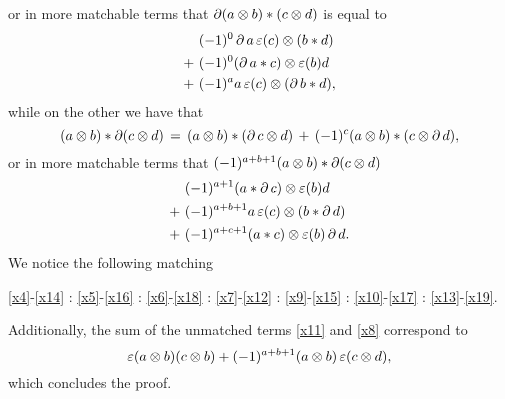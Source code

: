 or in more matchable terms that $\operatorname{\partial} (a \otimes b) \ast (c \otimes d)$ is equal to
\begin{align}& \label{x14}
	(-1)^0 \bd a \aug(c) \ot (b \ast d) \sk{+} \label{x15}
	(-1)^0 (\bd a \ast c) \ot \aug(b) d \sk{+} \label{x16}
	(-1)^{a} a \aug(c) \ot (\bd b \ast d),
\end{align}
while on the other we have that
\begin{equation*}
	(a \otimes b) \ast \operatorname{\partial} (c \otimes d) \,=\,
	(a \otimes b) \ast (\operatorname{\partial} c \otimes d) \,+\,
	(-1)^{c} (a \otimes b) \ast (c \otimes \operatorname{\partial} d),
\end{equation*}
or in more matchable terms that $(-1)^{a+b+1}(a \otimes b) \ast \operatorname{\partial} (c \otimes d)$
\begin{align}& \label{x17}
	(-1)^{a+1} (a \ast \bd c) \ot \aug(b) d \sk{+} \label{x18}
	(-1)^{a+b+1} a \aug(c) \ot (b \ast \bd d) \sk{+} \label{x19}
	(-1)^{a+c+1} (a \ast c) \ot \aug(b) \bd d.
\end{align}
We notice the following matching
\begin{center}
	\eqref{x4}-\eqref{x14} :
	\eqref{x5}-\eqref{x16} :
	\eqref{x6}-\eqref{x18} :
	\eqref{x7}-\eqref{x12} :
	\eqref{x9}-\eqref{x15} :
	\eqref{x10}-\eqref{x17} :
	\eqref{x13}-\eqref{x19}.
\end{center}
Additionally, the sum of the unmatched terms \eqref{x11} and \eqref{x8} correspond to
\[
\operatorname{\varepsilon}(a \otimes b) (c \otimes b) + (-1)^{a+b+1} (a \otimes b) \operatorname{\varepsilon}(c \otimes d),
\]
which concludes the proof.